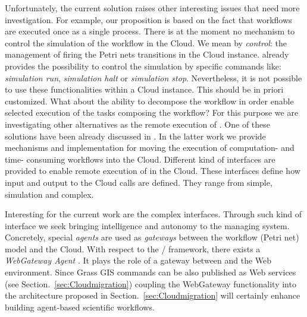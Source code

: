 Unfortunately, the current solution raises other interesting issues that need more investigation.
%
For example,  our proposition is based on the fact that workflows are executed once as a single process.
%
There is at the moment no mechanism to control the simulation of the workflow in the Cloud.
%
We mean by \emph{control}: the management of firing the Petri nets transitions in the Cloud instance. 
%
\Renew{} already provides the possibility to control the simulation by specific commands like: \emph{simulation run}, \emph{simulation halt} or \emph{simulation stop}.
%
Nevertheless, it is not possible to use these functionalities within a Cloud instance.
%
This should be in priori customized.
%
What about the ability to decompose the workflow in order enable selected execution of the tasks composing the workflow?
%
For this purpose we are investigating other alternatives as the remote execution of \Renew{}.
%
One of these solutions have been already discussed in \cite{Bendoukha+15a}.
%
In the latter work we provide mechanisms and implementation for moving the execution of computation- and time- consuming workflows into the Cloud.
%
Different kind of interfaces are provided to enable remote execution of \Renew{} in the Cloud.
%
These interfaces define how input and output to the Cloud calls are defined.
%
They range from simple, simulation and complex.

Interesting for the current work are the complex interfaces.
%
Through such kind of interface we seek bringing intelligence and autonomy to the managing system.
%
Concretely, special \emph{agents} are used as \emph{gateways} between the workflow (Petri net) model and the Cloud.
%
With respect to the \Mulan{}/\Capa{} framework, there exists a \emph{WebGateway Agent} \cite{Betz+14}.
%
It plays the role of a gateway between \Renew{} and the Web environment. 
%
Since Grass GIS commands can be also published as Web services (see Section.~\ref{sec:Cloudmigration}) coupling the WebGateway functionality into the architecture proposed in Section.~\ref{sec:Cloudmigration} will certainly enhance building agent-based scientific workflows.


